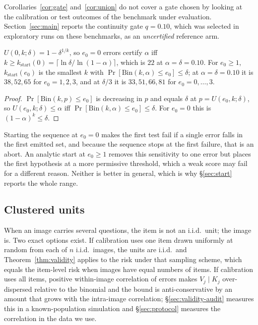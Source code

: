 Corollaries~\ref{cor:gate} and~\ref{cor:union} do not cover a gate chosen by looking at the calibration or test outcomes of the benchmark under evaluation. Section~\ref{sec:main} reports the continuity gate $q=0.10$, which was selected in exploratory runs on these benchmarks, as an
\emph{uncertified} reference arm.

\begin{lemma}
\label{lem:kstart}
$U(0,k;\delta)=1-\delta^{1/k}$, so $e_0=0$ errors certify $\alpha$ iff
$k\ge k_{\mathrm{start}}(0)=\lceil\ln\delta/\ln(1-\alpha)\rceil$, which is $22$ at $\alpha=\delta=0.10$.
For $e_0\ge1$, $k_{\mathrm{start}}(e_0)$ is the smallest $k$ with $\Pr[\mathrm{Bin}(k,\alpha)\le e_0]\le\delta$;
at $\alpha=\delta=0.10$ it is $38,52,65$ for $e_0=1,2,3$, and at $\delta/3$ it is $33,51,66,81$ for $e_0=0,\dots,3$.
\end{lemma}
\begin{proof}
$\Pr[\mathrm{Bin}(k,p)\le e_0]$ is decreasing in $p$ and equals $\delta$ at $p=U(e_0,k;\delta)$, so
$U(e_0,k;\delta)\le\alpha$ iff $\Pr[\mathrm{Bin}(k,\alpha)\le e_0]\le\delta$. For $e_0=0$ this is
$(1-\alpha)^k\le\delta$.
\end{proof}

Starting the sequence at $e_0=0$ makes the first test fail if a single error falls in the first
emitted set, and because the sequence stops at the first failure, that is an abort. An analytic start
at $e_0\ge1$ removes this sensitivity to one error but places the first hypothesis at a more
permissive threshold, which a weak score may fail for a different reason. Neither is better in
general, which is why \S\ref{sec:start} reports the whole range.

\subsection{Clustered units}
\label{sec:clusters}

When an image carries several questions, the item is not an i.i.d.\ unit; the image is. Two exact
options exist. If calibration uses one item drawn uniformly at random from each of $n$ i.i.d.\ images,
the units are i.i.d.\ and Theorem~\ref{thm:validity} applies to the risk under that sampling
scheme, which equals the item-level risk when images have equal numbers of items. If calibration uses all
items, positive within-image correlation of errors makes $V_j\mid K_j$ over-dispersed relative to the
binomial and the bound is anti-conservative by an amount that grows with the intra-image
correlation; \S\ref{sec:validity-audit} measures this in a known-population simulation and
\S\ref{sec:protocol} measures the correlation in the data we use.

